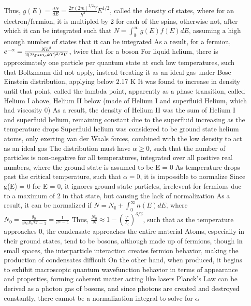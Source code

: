 \documentclass[11 pt, twoside]{article}
\newenvironment{outline*}
{
	\begin{outline}[enumerate]
	}
	{\end{outline}
}
\begin{document}
\begin{outline*}
			\4 Thus, $g(E) = \frac{dN}{dE} = \frac{2\pi(2m)^{3/2}V}{h^3}E^{1/2}$, called the density of states, where for an electron/fermion, it is multipled by 2 for each of the spins, otherwise not, after which it can be integrated such that $N = \int^{\infty}_0 g(E)f(E)dE$, assuming a high enough number of states that it can be integrated
			\4 As a result, for a fermion, $e^{-\alpha} = \frac{Nh^3}{2(2\p im_ekT)^{3/2}V}$, twice that for a boson
	\2 For liquid helium, there is approximately one particle per quantum state at such low temperatures, such that Boltzmann did not apply, instead treating it as an ideal gas under Bose-Einstein distribution, applying below 2.17 K
		\3 It was found to increase in density until that point, called the lambda point, apparently as a phase transition, called Helium I above, Helium II below (made of Helium I and superfluid Helium, which had viscosity 0)
			\4 As a result, the density of Helium II was the sum of Helium I and superfluid helium, remaining constant due to the superfluid increasing as the temperature drops
			\4 Superfluid helium was considered to be ground state helium atoms, only exerting van der Waals forces, combined with the low density to act as an ideal gas
		\3 The distribution must have $\alpha \geq 0$, such that the number of particles is non-negative for all temperatures, integrated over all positive real numbers, where the ground state is assumed to be E = 0
			\4 As temperature drops past the critical temperature, such that $\alpha = 0$, it is impossible to normalize
			\4 Since g(E) = 0 for E = 0, it ignores ground state particles, irrelevent for fermions due to a maximum of 2 in that state, but causing the lack of normalization
			\4 As a result, it can be normalized if $N = N_0 + \int_0^{\infty} n(E)dE$, where $N_0 = \frac{g_0}{e^{\alpha}e^{E_0/kT} - 1} = \frac{1}{e^{\alpha} - 1}$
			\4 Thus, $\frac{N_0}{N} \approx 1 - (\frac{T}{T_c})^{3/2}$, such that as the temperature approaches 0, the condensate approaches the entire material
		\3 Atoms, especially in their ground states, tend to be bosons, although made up of fermions, though in small spaces, the interparticle interaction creates fermion behavior, making the production of condensates difficult
			\4 On the other hand, when produced, it begins to exhibit macroscopic quantum wavefunction behavior in terms of appearance and properties, forming coherent matter acting like lasers
\1 Planck's Law can be derived as a photon gas of bosons, and since photons are created and destroyed constantly, there cannot be a normalization integral to solve for $\alpha$

\end{outline*}
\end{document}
